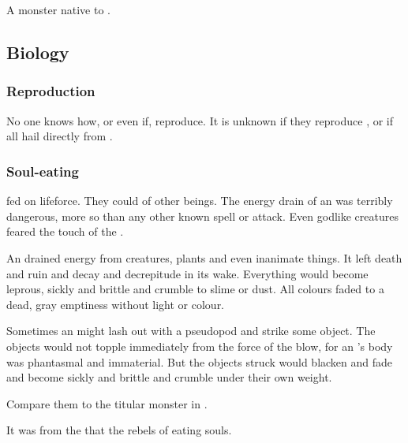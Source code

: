 \section{\Umbra}
\index{\umbra}
A monster native to \Erebos. 









\subsection{Biology}






\subsubsection{Reproduction}
No one knows how, or even if, \umbrae{} reproduce. 
It is unknown if they reproduce , or if all \umbrae{} hail directly from \Erebos. 





\subsubsection{Soul-eating}
\Umbrae{} fed on lifeforce. 
They could  of other beings.
The energy drain of an \umbra was terribly dangerous, more so than any other known spell or attack. 
Even godlike creatures feared the touch of the \umbrae.

An \umbra drained energy from creatures, plants and even inanimate things.
It left death and ruin and decay and decrepitude in its wake.
Everything would become leprous, sickly and brittle and crumble to slime or dust.
All colours faded to a dead, gray emptiness without light or colour. 

Sometimes an \umbra might lash out with a pseudopod and strike some object.
The objects would not topple immediately from the force of the blow, for an \umbra's body was phantasmal and immaterial. 
But the objects struck would blacken and fade and become sickly and brittle and crumble under their own weight. 

Compare them to the titular monster in \cite{HPLovecraft:TheColourOutofSpace}. 

It was from the \umbrae{} that the \Merkyran{} rebels  of eating souls. 









